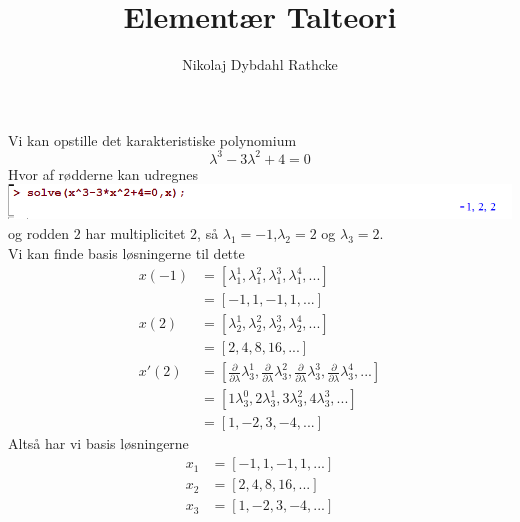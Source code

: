\documentclass[12pt]{article}
\title{Elementær Talteori}
\author{Nikolaj Dybdahl Rathcke}
\begin{document}
Vi kan opstille det karakteristiske polynomium
$$\lambda^3-3\lambda^2+4=0$$
Hvor af rødderne kan udregnes\\
\includegraphics[width=\textwidth]{1}\\
og rodden $2$ har multiplicitet $2$, så $\lambda_1=-1$,$\lambda_2=2$ og $\lambda_3=2$.\\
Vi kan finde basis løsningerne til dette
\begin{align*}
x(-1)&=[\lambda_1^1,\lambda_1^2,\lambda_1^3,\lambda_1^4,...] \\
&=[-1,1,-1,1,...] \\
x(2)&=[\lambda_2^1,\lambda_2^2,\lambda_2^3,\lambda_2^4,...] \\
&=[2,4,8,16,...] \\
x'(2)&=[\frac{\partial}{\partial\lambda}\lambda_3^1,\frac{\partial}{\partial\lambda}\lambda_3^2,\frac{\partial}{\partial\lambda}\lambda_3^3,\frac{\partial}{\partial\lambda}\lambda_3^4,...] \\
&=[1\lambda_3^0,2\lambda_3^1,3\lambda_3^2,4\lambda_3^3,...] \\
&=[1,-2,3,-4,...]
\end{align*}
Altså har vi basis løsningerne
\begin{align*}
x_1&=[-1,1,-1,1,...] \\
x_2&=[2,4,8,16,...] \\
x_3&=[1,-2,3,-4,...]
\end{align*}
\end{document}
